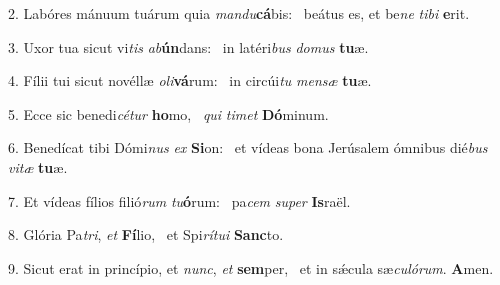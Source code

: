 2. Labóres mánuum tuárum quia \textit{man}\textit{du}\textbf{cá}bis: \ast\  beátus es, et be\textit{ne} \textit{ti}\textit{bi} \textbf{e}rit.\

3. Uxor tua sicut vi\textit{tis} \textit{ab}\textbf{ún}dans: \ast\  in latéri\textit{bus} \textit{do}\textit{mus} \textbf{tu}æ.\

4. Fílii tui sicut novéllæ \textit{o}\textit{li}\textbf{vá}rum: \ast\  in circúi\textit{tu} \textit{men}\textit{sæ} \textbf{tu}æ.\

5. Ecce sic benedi\textit{cé}\textit{tur} \textbf{ho}mo, \ast\  \textit{qui} \textit{ti}\textit{met} \textbf{Dó}minum.\

6. Benedícat tibi Dómi\textit{nus} \textit{ex} \textbf{Si}on: \ast\  et vídeas bona Jerúsalem ómnibus dié\textit{bus} \textit{vi}\textit{tæ} \textbf{tu}æ.\

7. Et vídeas fílios filió\textit{rum} \textit{tu}\textbf{ó}rum: \ast\  pa\textit{cem} \textit{su}\textit{per} \textbf{Is}raël.\

8. Glória Pa\textit{tri}, \textit{et} \textbf{Fí}lio, \ast\  et Spi\textit{rí}\textit{tu}\textit{i} \textbf{Sanc}to.\

9. Sicut erat in princípio, et \textit{nunc}, \textit{et} \textbf{sem}per, \ast\  et in sǽcula sæ\textit{cu}\textit{ló}\textit{rum}. \textbf{A}men.\

